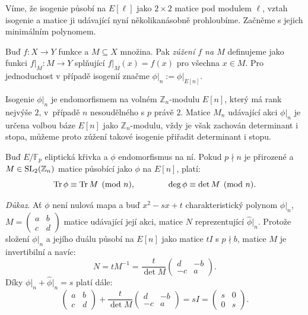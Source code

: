 \documentclass[12pt]{report}
\begin{document}
Víme, že isogenie působí na $E[\ell]$ jako $2 \times 2$ matice pod modulem $\ell$, vztah isogenie a matice ji udávající nyní několikanásobně prohloubíme. Začněme s jejich minimálním polynomem.

\begin{definice}
Buď $f : X \longrightarrow Y$ funkce a $M \subseteq X$ množina. Pak \textit{zúžení $f$ na $M$} definujeme jako funkci $f \vert_M : M \longrightarrow Y$ splňující $f \vert_M (x) = f(x)$ pro všechna $x \in M$. Pro jednoduchost v případě isogenií značme $\phi \vert_{n} := \phi \vert_{E[n]}$. 
\end{definice}

Isogenie $\phi \vert_{n}$ je endomorfismem na volném $\mathbb{Z}_n$-modulu $E[n]$, který má rank nejvýše $2$, v~případě $n$ nesoudělného s $p$ právě $2$. Matice $M_n$ udávající akci $\phi \vert_n$ je určena volbou báze $E[n]$ jako $\mathbb{Z}_n$-modulu, vždy je však zachován determinant i stopa, můžeme proto zúžení takové isogenie přiřadit determinant i stopu.
\begin{veta}
Buď $E/\mathbb{F}_p$ eliptická křivka a $\phi$ endomorfismus na ní. Pokud $p \nmid n$ je přirozené a $M \in \operatorname{SL}_2 (\mathbb{Z}_n)$ matice působící jako $\phi$ na $E[n]$, platí:
\begin{equation*}
\operatorname{Tr} \phi \equiv \operatorname{Tr} M \pmod{n}, \qquad \qquad \deg \phi \equiv \det M \pmod{n}.
\end{equation*}
\end{veta}
\noindent \textit{Důkaz}. Ať $\phi$ není nulová mapa a buď $x^2 - sx + t$ charakteristický polynom $\phi \vert_n$, $M = \begin{pmatrix} a & b\\ c & d \end{pmatrix}$ matice udávající její akci, matice $N$ reprezentující $\widehat{\phi} \vert_n$. Protože složení $\phi \vert_n$ a jejího duálu působí na $E[n]$ jako matice $t I$ s $p \nmid b$, matice $M$ je invertibilní a navíc:
\begin{equation*}
N = t M^{-1} = \frac{t}{\det M} \begin{pmatrix} d & -b\\ -c & a \end{pmatrix}.
\end{equation*} 
Díky $\phi \vert_n + \widehat{\phi} \vert_n = s$ platí dále:
\begin{equation*}
\begin{pmatrix} a & b\\ c & d \end{pmatrix} + \frac{t}{\det M} \begin{pmatrix} d & -b\\ -c & a \end{pmatrix} = sI = \begin{pmatrix} s & 0\\ 0 & s \end{pmatrix}.
\end{equation*}
\end{document}
